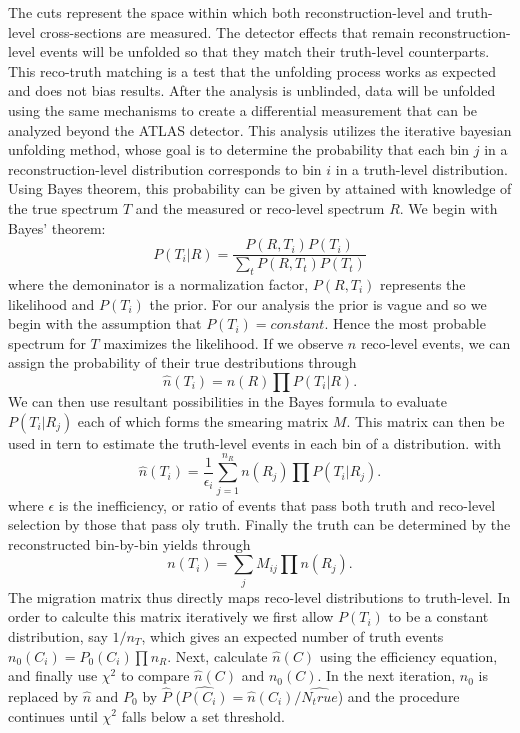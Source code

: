 The cuts represent the space within which both reconstruction-level and truth-level cross-sections are measured. The detector effects that remain reconstruction-level events will be unfolded so that they match their truth-level counterparts. This reco-truth matching is a test that the unfolding process works as expected and does not bias results. After the analysis is unblinded, data will be unfolded using the same mechanisms to create a differential measurement that can be analyzed beyond the ATLAS detector. This analysis utilizes the iterative bayesian unfolding method\cite{bayesian}, whose goal is to determine the probability that each bin $j$ in a reconstruction-level distribution corresponds to bin $i$ in a truth-level distribution. Using Bayes theorem, this probability can be given by attained with knowledge of the true spectrum $T$ and the measured or reco-level spectrum $R$. We begin with Bayes' theorem: 
\begin{equation}
P(T_i|R)=\frac{P(R,T_i)P(T_i)}{\sum_{t} P(R,T_t)P(T_t)}
\end{equation}
where the demoninator is a normalization factor, $P(R,T_i)$ represents the likelihood and $P(T_i)$ the prior. For our analysis the prior is vague and so we begin with the assumption that $P(T_i) = constant$. Hence the most probable spectrum for $T$ maximizes the likelihood. If we observe $n$ reco-level events,  we can assign the probability of their true destributions through
\begin{equation}
\hat{n}(T_i)=n(R)\prod P(T_i|R).
\end{equation}
We can then use resultant possibilities in the Bayes formula to evaluate $P(T_i|R_j)$ each of which forms the smearing matrix $M$. This matrix can then be used in tern to estimate the truth-level events in each bin of a distribution. with
\begin{equation}
\hat{n}(T_i)=\frac{1}{\epsilon_i}\sum_{j=1}^{n_R} n(R_j)\prod P(T_i|R_j).
\end{equation}
where $\epsilon$ is the inefficiency, or ratio of events that pass both truth and reco-level selection by those that pass oly truth. Finally the truth can be determined by the reconstructed bin-by-bin yields through
\begin{equation}
n(T_i)=\sum_j M_{ij} \prod n(R_j).
\end{equation}
The migration matrix thus directly maps reco-level distributions to truth-level. In order to calculte this matrix iteratively we first allow $P(T_i)$ to be a constant distribution, say $1/n_T$, which gives an expected number of truth events $n_0(C_i)=P_0(C_i)\prod n_R$. Next, calculate $\hat{n}(C)$ using the efficiency equation, and finally use $\chi^2$ to compare $\hat{n}(C)$ and $n_0(C)$. In the next iteration, $n_0$ is replaced by $\hat{n}$ and $P_0$ by $\hat{P}$ ($\hat{P(C_i)}=\hat{n}(C_i)/\hat{N_true}$) and the procedure continues until $\chi^2$ falls below a set threshold. 

